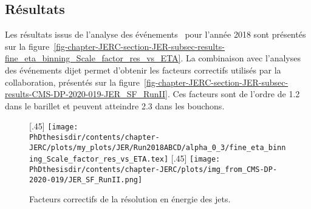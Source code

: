 \subsection{Résultats}\label{chapter-JERC-section-JER-subsec-results}
Les résultats issus de l'analyse des événements \Gjets\ pour l'année 2018 sont présentés sur la figure~\ref{fig-chapter-JERC-section-JER-subsec-results-fine_eta_binning_Scale_factor_res_vs_ETA}.
La combinaison avec l'analyses des événements dijet permet d'obtenir les facteurs correctifs utilisés par la collaboration, présentés sur la figure~\ref{fig-chapter-JERC-section-JER-subsec-results-CMS-DP-2020-019-JER_SF_RunII}.
Ces facteurs sont de l'ordre de \num{1.2} dans le barillet et peuvent atteindre \num{2.3} dans les bouchons.
\begin{figure}[h]
\centering
{}[.45\textwidth]
{\texttt{[image: \\PhDthesisdir/contents/chapter-JERC/plots/my\_plots/JER/Run2018ABCD/alpha\_0\_3/fine\_eta\_binning\_Scale\_factor\_res\_vs\_ETA.tex]}}
\hfill
{}[.45\textwidth]
{\texttt{[image: \\PhDthesisdir/contents/chapter-JERC/plots/img\_from\_CMS-DP-2020-019/JER\_SF\_RunII.png]}}

\caption{Facteurs correctifs de la résolution en énergie des jets.}
\end{figure}